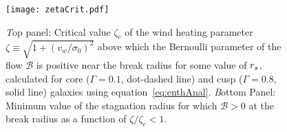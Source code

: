 \begin{figure}
\texttt{[image: zetaCrit.pdf]}
\caption{\label{fig:zetaCrit} {\emph Top panel:} Critical value
  $\zeta_c$ of the wind heating parameter $\zeta \equiv
  \sqrt{1+(v_w/\sigma_0)^2}$ above which the Bernoulli parameter of
  the flow $\mathcal{B}$ is positive near the break radius for some
  value of $r_s$, calculated for core ($\Gamma=0.1$, dot-dashed line)
  and cusp ($\Gamma=0.8$, solid line) galaxies using
  equation~\eqref{eq:enthAnal}. {\emph Bottom Panel:} Minimum value
  of the stagnation radius for which $\mathcal{B} > 0$ at the break
  radius as a function of $\zeta/\zeta_c < 1$. }
\end{figure}


